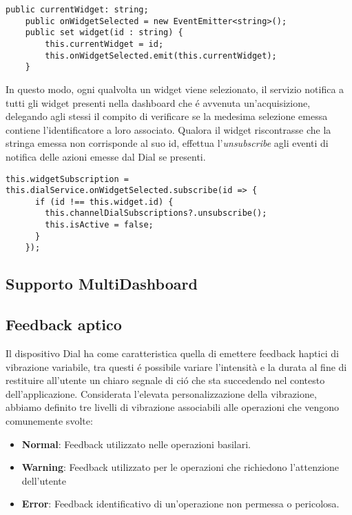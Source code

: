 \vspace{1.0cm}
\begin{lstlisting}[caption={Notifica selezione Widget e salvataggio id},style=javaScriptCode]
    public currentWidget: string;
    public onWidgetSelected = new EventEmitter<string>();
    public set widget(id : string) {
        this.currentWidget = id;
        this.onWidgetSelected.emit(this.currentWidget);
    }
\end{lstlisting} 
\vspace{1.0cm}

In questo modo, ogni qualvolta un widget viene selezionato, il servizio notifica a tutti gli widget presenti nella dashboard che é avvenuta un'acquisizione, delegando agli stessi il compito di verificare se la medesima selezione emessa contiene l'identificatore a loro associato. Qualora il widget riscontrasse che la stringa emessa non corrisponde al suo id, effettua l'\emph{unsubscribe} agli eventi di notifica delle azioni emesse dal Dial se presenti.

\vspace{1.0cm}
\begin{lstlisting}[caption={Sottoscrizione all'evento di notifica selezione Widget},style=javaScriptCode]
this.widgetSubscription = this.dialService.onWidgetSelected.subscribe(id => {
      if (id !== this.widget.id) {
        this.channelDialSubscriptions?.unsubscribe();
        this.isActive = false;
      }
    });
\end{lstlisting} 
\vspace{1.0cm}

\subsection{Supporto MultiDashboard}

\subsection{Feedback aptico}
Il dispositivo Dial ha come caratteristica quella di emettere feedback haptici di vibrazione variabile, tra questi é possibile variare l'intensità e la durata al fine di restituire all'utente un chiaro segnale di ció che sta succedendo nel contesto dell'applicazione.
Considerata l'elevata personalizzazione della vibrazione, abbiamo definito tre livelli di vibrazione associabili alle operazioni che vengono comunemente svolte:

\begin{itemize}
\item \textbf{Normal}: Feedback utilizzato nelle operazioni basilari.
\item \textbf{Warning}: Feedback utilizzato per le operazioni che richiedono l'attenzione dell'utente
\item \textbf{Error}: Feedback identificativo di un'operazione non permessa o pericolosa.
\end{itemize} 

